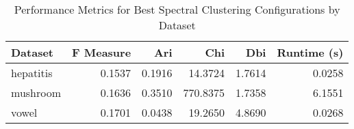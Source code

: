 \begin{table*}[ht!]
\caption{Performance Metrics for Best Spectral Clustering Configurations by Dataset}
\label{tab:best_configs_spectral_clustering_performance}
\begin{tabular}{lrrrrr}
Dataset & F Measure & Ari & Chi & Dbi & Runtime (s) \\\midrule

hepatitis & 0.1537 & 0.1916 & 14.3724 & 1.7614 & 0.0258 \\
mushroom & 0.1636 & 0.3510 & 770.8375 & 1.7358 & 6.1551 \\
vowel & 0.1701 & 0.0438 & 19.2650 & 4.8690 & 0.0268 \\
\end{tabular}
\end{table*}
